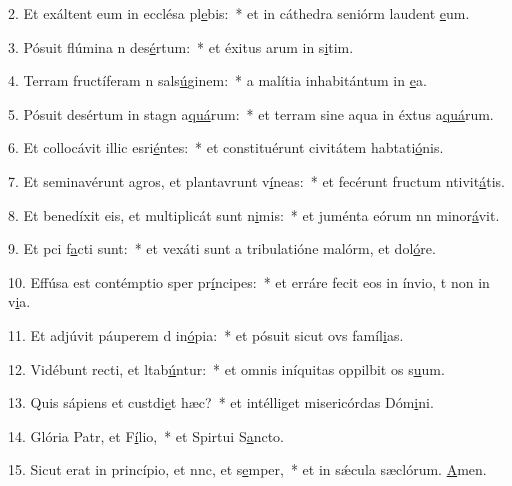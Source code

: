 2. Et exáltent eum in ecclésa pl\uline{e}bis:~* et in cáthedra seniórm laudent \uline{e}um.\par 
3. Pósuit flúmina n des\uline{é}rtum:~* et éxitus arum in s\uline{i}tim.\par 
4. Terram fructíferam n sals\uline{ú}ginem:~* a malítia inhabitántum in \uline{e}a.\par 
5. Pósuit desértum in stagn a\uline{quá}rum:~* et terram sine aqua in éxtus a\uline{quá}rum.\par 
6. Et collocávit illic esri\uline{é}ntes:~* et constituérunt civitátem habtati\uline{ó}nis.\par 
7. Et seminavérunt agros, et plantavrunt v\uline{í}neas:~* et fecérunt fructum ntivit\uline{á}tis.\par 
8. Et benedíxit eis, et multiplicát sunt n\uline{i}mis:~* et juménta eórum nn minor\uline{á}vit.\par 
9. Et pci f\uline{a}cti sunt:~* et vexáti sunt a tribulatióne malórm, et dol\uline{ó}re.\par 
10. Effúsa est contémptio sper pr\uline{í}ncipes:~* et erráre fecit eos in ínvio, t non in v\uline{i}a.\par 
11. Et adjúvit páuperem d in\uline{ó}pia:~* et pósuit sicut ovs famíl\uline{i}as.\par 
12. Vidébunt recti, et ltab\uline{ú}ntur:~* et omnis iníquitas oppilbit os s\uline{u}um.\par 
13. Quis sápiens et custdi\uline{e}t hæc?~* et intélliget misericórdas Dóm\uline{i}ni.\par 
14. Glória Patr, et F\uline{í}lio,~* et Spirtui S\uline{a}ncto.\par 
15. Sicut erat in princípio, et nnc, et s\uline{e}mper,~* et in sǽcula sæclórum. \uline{A}men.\par 
